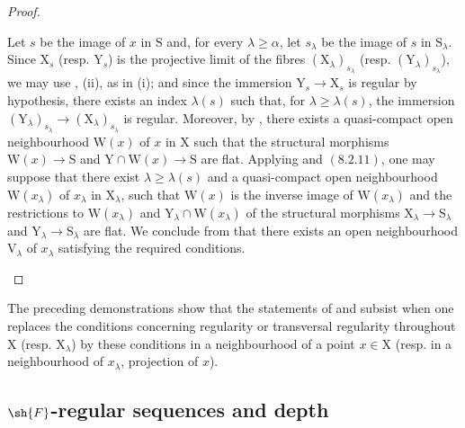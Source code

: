 \begin{proof}
\begin{enumerate}
Let $s$ be the image of $x$ in $\mathrm{S}$ and, for every $\lambda\geqslant\alpha$, let $s_\lambda$ be the image of $s$ in $\mathrm{S}_\lambda$. Since $\mathrm{X}_s$ (resp. $\mathrm{Y}_s$) is the projective limit of the fibres $(\mathrm{X}_\lambda)_{s_\lambda}$ (resp. $(\mathrm{Y}_\lambda)_{s_\lambda}$), we may use , (ii), as in (i); and since the immersion $\mathrm{Y}_s\to\mathrm{X}_s$ is regular by hypothesis, there exists an index $\lambda(s)$ such that, for $\lambda\geqslant\lambda(s)$, the immersion $(\mathrm{Y}_\lambda)_{s_\lambda}\to(\mathrm{X}_\lambda)_{s_\lambda}$ is regular. Moreover, by , there exists a quasi-compact open neighbourhood $\mathrm{W}(x)$ of $x$ in $\mathrm{X}$ such that the structural morphisms $\mathrm{W}(x)\to\mathrm{S}$ and $\mathrm{Y}\cap\mathrm{W}(x)\to\mathrm{S}$ are flat. Applying  and $(8.2.11)$, one may suppose that there exist $\lambda\geqslant\lambda(s)$ and a quasi-compact open neighbourhood $\mathrm{W}(x_\lambda)$ of $x_\lambda$ in $\mathrm{X}_\lambda$, such that $\mathrm{W}(x)$ is the inverse image of $\mathrm{W}(x_\lambda)$ and the restrictions to $\mathrm{W}(x_\lambda)$ and $\mathrm{Y}_\lambda\cap\mathrm{W}(x_\lambda)$ of the structural morphisms $\mathrm{X}_\lambda\to\mathrm{S}_\lambda$ and $\mathrm{Y}_\lambda\to\mathrm{S}_\lambda$ are flat. We conclude from  that there exists an open neighbourhood $\mathrm{V}_\lambda$ of $x_\lambda$ satisfying the required conditions.
\end{enumerate}
\end{proof}

\begin{remark}[19.8.3]
\label{IV.19.8.3}
The preceding demonstrations show that the statements of  and  subsist when one replaces the conditions concerning regularity or transversal regularity throughout $\mathrm{X}$ (resp. $\mathrm{X}_\lambda$) by these conditions in a neighbourhood of a point $x\in\mathrm{X}$ (resp. in a neighbourhood of $x_\lambda$, projection of $x$).
\end{remark}

\subsection{\texorpdfstring{$\sh{F}$}{F}-regular sequences and depth}
\label{subsection:IV.19.9}


